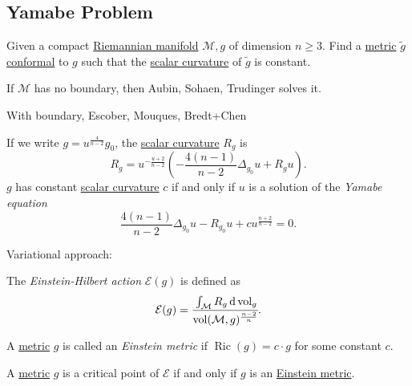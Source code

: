 \subsection{Yamabe Problem}
\begin{problem}\label{prb:Yamabe}
Given a compact \hyperref[def:Riemannian-manifold]{Riemannian manifold} \(\mathcal{M} , g\) of dimension \(n \geq 3\). Find a \hyperref[def:Riemannian-metric]{metric} \(\widetilde{g} \) \hyperref[def:conformal]{conformal} to \(g\) such that the \hyperref[def:Ricci-scalar-curvature]{scalar curvature} of \(\widetilde{g} \) is constant.
\end{problem}

If \(\mathcal{M} \) has no boundary, then Aubin, Sohaen, Trudinger solves it.

With boundary, Escober, Mouques, Bredt+Chen

If we write \(g = u^{\frac{4}{n-2}} g_0\), the \hyperref[def:Ricci-scalar-curvature]{scalar curvature} \(R_g\) is
\begin{equation}\label{eq:lec28}
	R_g
	= u^{-\frac{u+2}{n-2}} \left( - \frac{4(n-1)}{n-2} \Delta _{g_0} u + R_g u \right) .
\end{equation}
\(g\) has constant \hyperref[def:Ricci-scalar-curvature]{scalar curvature} \(c\) if and only if \(u\) is a solution of the \emph{Yamabe equation}
\begin{equation}\label{eq:Yamabe}
	\frac{4(n-1)}{n-2} \Delta _{g_0} u - R_{g_0} u + cu^{\frac{n+2}{n-2}} = 0.
\end{equation}


Variational approach:

\begin{definition}\label{def:Einstein-Hilbert-action}
	The \emph{Einstein-Hilbert action} \(\mathcal{E} (g)\) is defined as
	\[
		\mathcal{E} (g) = \cfrac{\int _\mathcal{M} R_g \,\mathrm{d} \mathop{\mathrm{vol}} _g}{\mathop{\mathrm{vol}}(\mathcal{M} , g)^{\frac{n-2}{n}} }.
	\]
\end{definition}
\begin{definition}\label{def:Einstein-metric}
	A \hyperref[def:Riemannian-metric]{metric} \(g\) is called an \emph{Einstein metric} if \(\mathop{\mathrm{Ric}}(g) = c\cdot g \) for some constant \(c\).
\end{definition}
\begin{remark}
	A \hyperref[def:Riemannian-metric]{metric} \(g\) is a critical point of \(\mathcal{E} \) if and only if \(g\) is an \hyperref[def:Einstein-metric]{Einstein metric}.
\end{remark}


